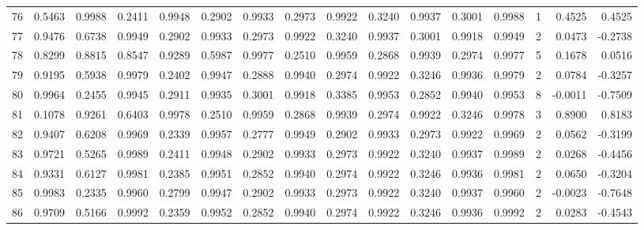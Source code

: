 \begin{tabular}{lrrrrrrrrrrrrrrr}
76  &      0.5463 &  0.9988 &  0.2411 &  0.9948 &  0.2902 &  0.9933 &  0.2973 &  0.9922 &  0.3240 &  0.9937 &   0.3001 &     0.9988 &      1 &                    0.4525 &                     0.4525 \\
77  &      0.9476 &  0.6738 &  0.9949 &  0.2902 &  0.9933 &  0.2973 &  0.9922 &  0.3240 &  0.9937 &  0.3001 &   0.9918 &     0.9949 &      2 &                    0.0473 &                    -0.2738 \\
78  &      0.8299 &  0.8815 &  0.8547 &  0.9289 &  0.5987 &  0.9977 &  0.2510 &  0.9959 &  0.2868 &  0.9939 &   0.2974 &     0.9977 &      5 &                    0.1678 &                     0.0516 \\
79  &      0.9195 &  0.5938 &  0.9979 &  0.2402 &  0.9947 &  0.2888 &  0.9940 &  0.2974 &  0.9922 &  0.3246 &   0.9936 &     0.9979 &      2 &                    0.0784 &                    -0.3257 \\
80  &      0.9964 &  0.2455 &  0.9945 &  0.2911 &  0.9935 &  0.3001 &  0.9918 &  0.3385 &  0.9953 &  0.2852 &   0.9940 &     0.9953 &      8 &                   -0.0011 &                    -0.7509 \\
81  &      0.1078 &  0.9261 &  0.6403 &  0.9978 &  0.2510 &  0.9959 &  0.2868 &  0.9939 &  0.2974 &  0.9922 &   0.3246 &     0.9978 &      3 &                    0.8900 &                     0.8183 \\
82  &      0.9407 &  0.6208 &  0.9969 &  0.2339 &  0.9957 &  0.2777 &  0.9949 &  0.2902 &  0.9933 &  0.2973 &   0.9922 &     0.9969 &      2 &                    0.0562 &                    -0.3199 \\
83  &      0.9721 &  0.5265 &  0.9989 &  0.2411 &  0.9948 &  0.2902 &  0.9933 &  0.2973 &  0.9922 &  0.3240 &   0.9937 &     0.9989 &      2 &                    0.0268 &                    -0.4456 \\
84  &      0.9331 &  0.6127 &  0.9981 &  0.2385 &  0.9951 &  0.2852 &  0.9940 &  0.2974 &  0.9922 &  0.3246 &   0.9936 &     0.9981 &      2 &                    0.0650 &                    -0.3204 \\
85  &      0.9983 &  0.2335 &  0.9960 &  0.2799 &  0.9947 &  0.2902 &  0.9933 &  0.2973 &  0.9922 &  0.3240 &   0.9937 &     0.9960 &      2 &                   -0.0023 &                    -0.7648 \\
86  &      0.9709 &  0.5166 &  0.9992 &  0.2359 &  0.9952 &  0.2852 &  0.9940 &  0.2974 &  0.9922 &  0.3246 &   0.9936 &     0.9992 &      2 &                    0.0283 &                    -0.4543 \\

\end{tabular}
